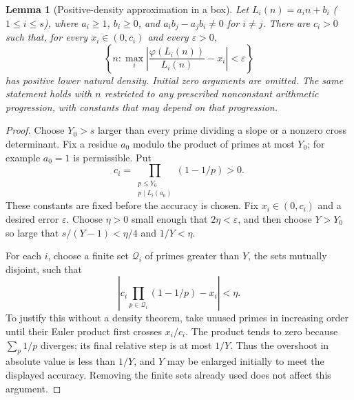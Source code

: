 \documentclass[11pt,a4paper]{article}
\newtheorem{lemma}[theorem]{Lemma}
\theoremstyle{definition}\newtheorem{definition}[theorem]{Definition}
\theoremstyle{remark}\newtheorem{remark}[theorem]{Remark}
\newcommand{\ph}{\varphi}\newcommand{\rad}{\operatorname{rad}}
\newcommand{\eps}{\varepsilon}
\begin{document}
\begin{lemma}[Positive-density approximation in a box]\label{lem:box}
Let $L_i(n)=a_i n+b_i$ ($1\le i\le s$), where $a_i\ge1$, $b_i\ge0$, and
$a_i b_j-a_j b_i\ne0$ for $i\ne j$.
There are $c_i>0$ such that, for every $x_i\in(0,c_i)$ and every $\eps>0$,
\[
 \left\{n:\max_i\left|\frac{\ph(L_i(n))}{L_i(n)}-x_i\right|<\eps\right\}
\]
has positive lower natural density. Initial zero arguments are omitted.
The same statement holds with $n$ restricted to any prescribed nonconstant
arithmetic progression, with constants that may depend on that progression.
\end{lemma}
\begin{proof}
Choose $Y_0>s$ larger than every prime dividing a slope or a nonzero cross
determinant. Fix a residue $a_0$ modulo the product of primes at most $Y_0$;
for example $a_0=1$ is permissible. Put
\[
 c_i=\prod_{\substack{p\le Y_0\\p\mid L_i(a_0)}}(1-1/p)>0.
\]
These constants are fixed before the accuracy is chosen.
Fix $x_i\in(0,c_i)$ and a desired error $\eps$.
Choose $\eta>0$ small enough that $2\eta<\eps$, and then choose $Y>Y_0$
so large that $s/(Y-1)<\eta/4$ and $1/Y<\eta$.

For each $i$, choose a finite set $\mathcal Q_i$ of primes greater than $Y$,
the sets mutually disjoint, such that
\[
 \left|c_i\prod_{p\in\mathcal Q_i}(1-1/p)-x_i\right|<\eta.
\]
To justify this without a density theorem, take unused primes in increasing
order until their Euler product first crosses $x_i/c_i$.
The product tends to zero because $\sum_p1/p$ diverges; its final relative
step is at most $1/Y$. Thus the overshoot in absolute value is less than
$1/Y$, and $Y$ may be enlarged initially to meet the displayed accuracy.
Removing the finite sets already used does not affect this argument.


\end{proof}
\end{document}

